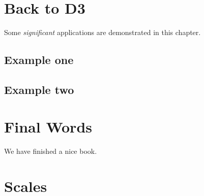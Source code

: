 \documentclass[]{book}
\begin{document}
\hypertarget{back-to-d3}{%
\chapter{Back to D3}\label{back-to-d3}}

Some \emph{significant} applications are demonstrated in this chapter.

\hypertarget{example-one}{%
\section{Example one}\label{example-one}}

\hypertarget{example-two}{%
\section{Example two}\label{example-two}}

\hypertarget{final-words}{%
\chapter{Final Words}\label{final-words}}

We have finished a nice book.

\hypertarget{scales}{%
\chapter{Scales}\label{scales}}


\end{document}
